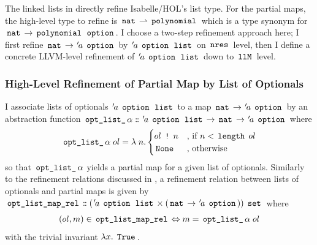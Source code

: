 The linked lists in  directly refine Isabelle/HOL's list type.
For the partial maps, the high-level type to refine is $\,\text{\ttfamily nat}\, \rightharpoonup \,\text{\ttfamily polynomial}\,$ which is a type synonym for $\,\text{\ttfamily nat}\, \rightarrow \,\text{\ttfamily polynomial}\, \; \,\text{\ttfamily option}\,$.
I choose a two-step refinement approach here; I first refine $\,\text{\ttfamily nat}\, \rightarrow {\mskip2mu '\mskip-2mua} \; \,\text{\ttfamily option}\,$ by ${\mskip2mu '\mskip-2mua} \; \,\text{\ttfamily option}\, \; \,\text{\ttfamily list}\,$ on $\,\text{\ttfamily nres}\,$ level, then I define a concrete LLVM-level refinement of ${\mskip2mu '\mskip-2mua} \; \,\text{\ttfamily option}\, \; \,\text{\ttfamily list}\,$ down to $\,\text{\ttfamily llM}\,$ level.

\subsubsection{High-Level Refinement of Partial Map by List of Optionals}\label{sec:partial-map-by-list-of-optionals}

I associate lists of optionals ${\mskip2mu '\mskip-2mua} \; \,\text{\ttfamily option}\, \; \,\text{\ttfamily list}\,$ to a map $\,\text{\ttfamily nat}\, \rightarrow {\mskip2mu '\mskip-2mua} \; \,\text{\ttfamily option}\,$ by an abstraction function $\,\text{\ttfamily opt\_list\_}\,\alpha \mathrel{\mathord{:}\mkern-1.2mu\mathord{:}} {\mskip2mu '\mskip-2mua} \; \,\text{\ttfamily option}\, \; \,\text{\ttfamily list}\, \rightarrow \,\text{\ttfamily nat}\, \rightarrow {\mskip2mu '\mskip-2mua} \; \,\text{\ttfamily option}\,$ where
\begin{gather*}
	\,\text{\ttfamily opt\_list\_}\,\alpha \; ol = \lambda \; n.
	\begin{cases}
		ol \; \,\text{\ttfamily !}\, \; n & \text{, if $n < \,\text{\ttfamily length}\, \; ol$} \\
		\,\text{\ttfamily None}\,             & \text{, otherwise}
	\end{cases}
\end{gather*}
so that $\,\text{\ttfamily opt\_list\_}\,\alpha$ yields a partial map for a given list of optionals.
Similarly to the refinement relations discussed in , a refinement relation between lists of optionals and partial maps is given by $\,\text{\ttfamily opt\_list\_map\_rel}\, \mathrel{\mathord{:}\mkern-1.2mu\mathord{:}} ({\mskip2mu '\mskip-2mua} \; \,\text{\ttfamily option}\, \; \,\text{\ttfamily list}\, \times (\,\text{\ttfamily nat}\, \rightarrow {\mskip2mu '\mskip-2mua} \; \,\text{\ttfamily option}\,)) \; \,\text{\ttfamily set}\,$ where
\begin{gather*}
	(ol,m) \in \,\text{\ttfamily opt\_list\_map\_rel}\, \Leftrightarrow m = \,\text{\ttfamily opt\_list\_}\,\alpha \; ol
\end{gather*}
with the trivial invariant $\lambda x. \; \,\text{\ttfamily True}\,$.

